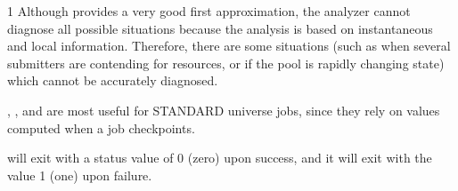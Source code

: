 \begin{ManPage}{\label{man-condor-q}}{1}
\GenRem
Although  provides a very good first approximation, the analyzer 
cannot diagnose all possible situations because the analysis is based on 
instantaneous and local information.  Therefore, there are some situations 
(such as when several submitters are contending for resources, or if the pool 
is rapidly changing state) which cannot be accurately diagnosed.

, , and  are most useful for STANDARD
universe jobs, since they rely on values computed when a job
checkpoints.

\ExitStatus

 will exit with a status value of 0 (zero) upon success,
and it will exit with the value 1 (one) upon failure.

\end{ManPage}
